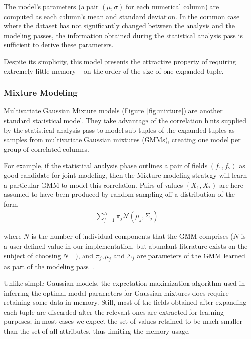The model's parameters (a pair $(\mu, \sigma)$ for each numerical column) are computed as each column's mean and standard deviation. In the common case where the dataset has not significantly changed between the analysis and the modeling passes, the information obtained during the statistical analysis pass is sufficient to derive these parameters.

Despite its simplicity, this model presents the attractive property of requiring extremely little memory -- on the order of the size of one expanded tuple.


\subsubsection{Mixture Modeling}
\label{sec:mixture_model}
Multivariate Gaussian Mixture models (Figure~\ref{fig:mixture}) are another standard statistical model.  They take advantage of the correlation hints supplied by the statistical analysis pass to model sub-tuples of the expanded tuples as samples from multivariate Gaussian mixtures (GMMs), creating one model per group of correlated columns.

For example, if the statistical analysis phase outlines a pair of fields $(f_1, f_2)$ as good candidate for joint modeling, then the Mixture modeling strategy will learn a particular GMM to model this correlation. Pairs of values $(X_1, X_2)$ are here assumed to have been produced by random sampling off a distribution of the form
\begin{align*}
\sum_{j=1}^{N} \pi_j \mathcal N(\mu_j, \Sigma_j)
\end{align*}

where $N$ is the number of individual components that the GMM comprises ($N$ is a user-defined value in our implementation, but abundant literature exists on the subject of choosing $N$~\cite{Schwartz1978}~\cite{Akaike1974}), and $\pi_j, \mu_j$ and $\Sigma_j$ are parameters of the GMM learned as part of the modeling pass~\cite{Dempster1977}.

Unlike simple Gaussian models, the expectation maximization algorithm used in inferring the optimal model parameters for Gaussian mixtures does require retaining some data in memory. Still, most of the fields obtained after expanding each tuple are discarded after the relevant ones are extracted for learning purposes; in most cases we expect the set of values retained to be much smaller than the set of all attributes, thus limiting the memory usage. 


